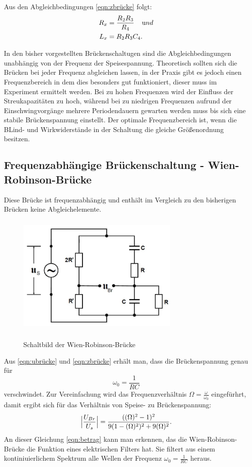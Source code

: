 Aus den Abgleichbedingungen \ref{eqn:zbrücke} folgt:
\begin{align}
  R_{x} &=\frac{R_{2} R_{3}}{R_{4}} \;\;\;\; \text und \\
  L_{x} &=R_{2}R_{3}C_{4}.
  \label{eqn:mx}
\end{align}

\noindent In den bisher vorgestellten Brückenschaltugen sind die Abgleichbedingungen
unabhängig von der Frequenz der Speisespannung. Theoretisch sollten sich die Brücken bei jeder
Frequenz abgleichen lassen, in der Praxis gibt es jedoch einen Frequenzbereich in dem
dies besonders gut funktioniert, dieser muss im Experiment ermittelt werden.
Bei zu hohen Frequenzen wird der Einfluss der Streukapazitäten zu hoch, während
bei zu niedrigen Frequenzen aufrund der Einschwingvorgänge mehrere Periodendauern
gewarten werden muss bis sich eine stabile Brückenspannung einstellt.
Der optimale Frequenzbereich ist, wenn die BLind- und Wirkwiderstände in der
Schaltung die gleiche Größenordnung besitzen.

\subsection{Frequenzabhängige Brückenschaltung - Wien-Robinson-Brücke}
Diese Brücke ist frequenzabhängig und enthält im Vergleich zu den bisherigen Brücken
keine Abgleichelemente.
\begin{figure}[H]
  \centering
  \includegraphics[width=8cm,height=6cm]{wien.JPG}
  \caption{Schaltbild der Wien-Robinson-Brücke}
  \label{fig:wien}
  \cite{skript}
\end{figure}

Aus \ref{eqn:ubrücke} und \ref{eqn:zbrücke} erhält man, dass die Brückenspannung genau für
\begin{equation*}
  \omega_{0}=\frac{1}{RC}
  \label{eqn:omega}
\end{equation*}
verschwindet.
Zur Vereinfachung wird das Frequenzverhältnis $\Omega=\frac{\omega}{\omega_{0}}$
eingefürhrt, damit ergibt sich für das Verhältnis von Speise- zu Brückenspannung:
\begin{equation}
  \Bigl|\frac{U_{Br}}{U_{s}}\Bigr|=\frac{((\Omega)^2-1)^2}{9(1-(\Omega)^2)^2+9(\Omega)^2}.
  \label{eqn:betrag}
\end{equation}
An dieser Gleichung \ref{eqn:betrag} kann man erkennen, das die Wien-Robinson-Brücke
die Funktion eines elektrischen Filters hat. Sie filtert aus einem kontiniuierlichem
Spektrum alle Wellen der Frequenz $\omega_{0}=\frac{1}{RC}$ heraus.

